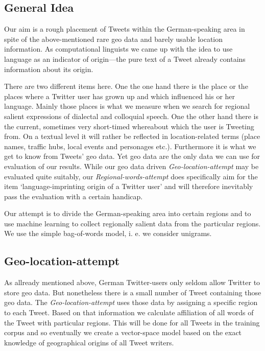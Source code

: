 \documentclass[./Main.tex]{subfiles}
\begin{document}
\subsection{General Idea}
Our aim is a rough placement of Tweets within the German-speaking area in spite of the above-mentioned rare geo data and barely usable location information. As computational linguists we came up with the idea to use language as an indicator of origin---the pure text of a Tweet already contains information about its origin.

There are two different items here. One the one hand there is the place or the places where a Twitter user has grown up and which influenced his or her language. Mainly those places is what we measure when we search for regional salient expressions of dialectal and colloquial speech. One the other hand there is the current, sometimes very short-timed whereabout which the user is Tweeting from. On a textual level it will rather be reflected in location-related terms (place names, traffic hubs, local events and personages etc.). Furthermore it is what we get to know from Tweets' geo data. Yet geo data are the only data we can use for evaluation of our results. While our geo data driven \emph{Geo-location-attempt} may be evaluated quite suitably, our \emph{Regional-words-attempt} does specifically aim for the item `language-imprinting origin of a Twitter user' and will therefore inevitably pass the evaluation with a certain handicap.

Our attempt is to divide the German-speaking area into certain regions and to use machine learning to collect regionally salient data from the particular regions. We use the simple bag-of-words model, i. e. we consider unigrams.



\subsection{Geo-location-attempt}
As allready mentioned above, German Twitter-users only seldom allow Twitter to store geo data. But nonetheless there is a small number of Tweet containing those geo data. The \emph{Geo-location-attempt} uses those data by assigning a specific region to each Tweet. Based on that information we calculate affiliation of all words of the Tweet with particular regions. This will be done for all Tweets in the training corpus and so eventually we create a vector-space model based on the exact knowledge of geographical origins of all Tweet writers.
\end{document}
